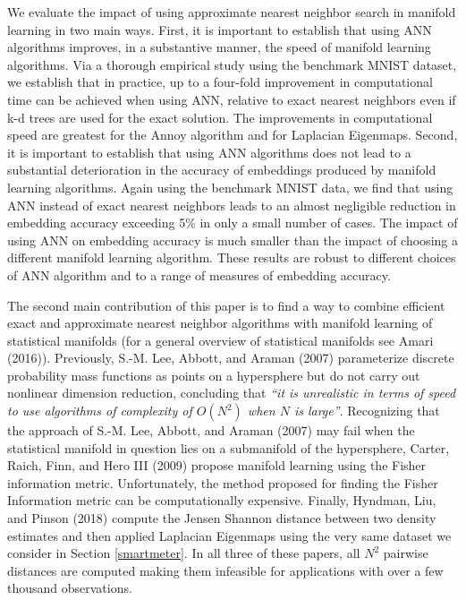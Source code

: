 \documentclass[12pt]{article}
\begin{document}
We evaluate the impact of using approximate nearest neighbor search in manifold learning in two main ways. First, it is important to establish that using ANN algorithms improves, in a substantive manner, the speed of manifold learning algorithms. Via a thorough empirical study using the benchmark MNIST dataset, we establish that in practice, up to a four-fold improvement in computational time can be achieved when using ANN, relative to exact nearest neighbors even if k-d trees are used for the exact solution. The improvements in computational speed are greatest for the Annoy algorithm and for Laplacian Eigenmaps. Second, it is important to establish that using ANN algorithms does not lead to a substantial deterioration in the accuracy of embeddings produced by manifold learning algorithms. Again using the benchmark MNIST data, we find that using ANN instead of exact nearest neighbors leads to an almost negligible reduction in embedding accuracy exceeding 5\% in only a small number of cases. The impact of using ANN on embedding accuracy is much smaller than the impact of choosing a different manifold learning algorithm. These results are robust to different choices of ANN algorithm and to a range of measures of embedding accuracy.

The second main contribution of this paper is to find a way to combine efficient exact and approximate nearest neighbor algorithms with manifold learning of statistical manifolds (for a general overview of statistical manifolds see Amari (2016)). Previously, S.-M. Lee, Abbott, and Araman (2007) parameterize discrete probability mass functions as points on a hypersphere but do not carry out nonlinear dimension reduction, concluding that \emph{``it is unrealistic in terms of speed to use algorithms of complexity of \(O(N^2)\) when \(N\) is large''}. Recognizing that the approach of S.-M. Lee, Abbott, and Araman (2007) may fail when the statistical manifold in question lies on a submanifold of the hypersphere, Carter, Raich, Finn, and Hero III (2009) propose manifold learning using the Fisher information metric. Unfortunately, the method proposed for finding the Fisher Information metric can be computationally expensive. Finally, Hyndman, Liu, and Pinson (2018) compute the Jensen Shannon distance between two density estimates and then applied Laplacian Eigenmaps using the very same dataset we consider in Section \ref{smartmeter}. In all three of these papers, all \(N^2\) pairwise distances are computed making them infeasible for applications with over a few thousand observations.
\end{document}

